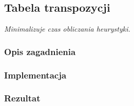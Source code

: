 \subsection{Tabela transpozycji}
\label{subsec:tabela-transpozycji}
\textit{Minimalizuje czas obliczania heurystyki.}



\subsubsection{Opis zagadnienia}
\subsubsection{Implementacja}
\subsubsection{Rezultat}